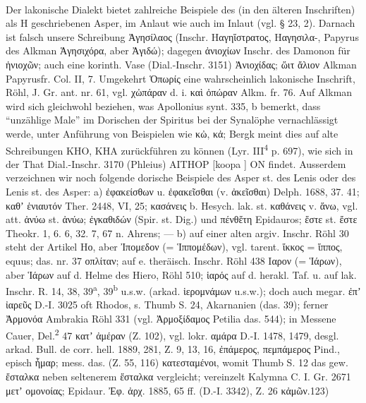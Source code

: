 \paragraph{} Der lakonische Dialekt bietet zahlreiche Beispiele des (in den
älteren Inschriften) als H geschriebenen Asper, im Anlaut wie auch im Inlaut
(vgl. § 23, 2). Darnach ist falsch unsere Schreibung Ἀγησίλαος (Inschr.
Ηαγηἵστρατος, Ηαγησιλα-, Papyrus des Alkman Ἁγησιχόρα, aber Ἀγιδώ); dagegen
ἀνιοχίων Inschr. des Damonon für ἡνιοχῶν; auch eine korinth. Vase (Dial.-Inschr.
3151) Ἀνιοχίδας; ὥιτ ἄλιον Alkman Papyrusfr. Col. II, 7. Umgekehrt Ὁπωρίς eine
wahrscheinlich lakonische Inschrift, Röhl, J. Gr. ant. nr. 61, vgl. χὠπάραν d.
i. καὶ ὀπώραν Alkm. fr. 76. Auf Alkman wird sich gleichwohl beziehen, was
Apollonius synt. 335, b bemerkt, dass “unzählige Male” im Dorischen der Spiritus
bei der Synalöphe vernachlässigt werde, unter Anführung von Beispielen wie κὠ,
κἀ; Bergk meint dies auf alte Schreibungen ΚΗΟ, ΚΗΑ zurückführen zu können (Lyr.
III\textsuperscript{4} p. 697), wie sich in der That Dial.-Inschr. 3170
(Phleius) ΑΙΤΗΟΡ [koopa ] ΟΝ findet. Ausserdem verzeichnen wir noch folgende
dorische Beispiele des Asper st. des Lenis oder des Lenis st. des Asper: a)
ἐφακείσθων u. ἐφακεῖσθαι (v. ἀκεῖσθαι) Delph. 1688, 37. 41; καθʼ ἑνιαυτόν Ther.
2448, VI, 25; κασάνεις b. Hesych. lak. st. καθάνεις v. ἅνω, vgl. att. ἁνύω st.
ἀνύω; ἐγκαθιδών (Spir. st. Dig.) und πένθἕτη Epidauros; ἕστε st. ἔστε Theokr. 1,
6. 6, 32. 7, 67 n. Ahrens; — b) auf einer alten argiv. Inschr. Röhl 30 steht der
Artikel Ηο, aber Ἰπομεδον (= Ἱππομέδων), vgl. tarent. ἴκκος = ἵππος, equus; das.
nr. 37 οπλίταν; auf e. theräisch. Inschr. Röhl 438 Ιαρον (= Ἱάρων), aber Ἱάρων
auf d. Helme des Hiero, Röhl 510; ἱαρός auf d. herakl. Taf. u. auf lak. Inschr.
R. 14, 38, 39\textsuperscript{a}, 39\textsuperscript{b} u.s.w. (arkad.
ἱερομνάμων u.s.w.); doch auch megar. ἐπʼ ἰαρεῦς D.-I. 3025 oft Rhodos, s.
Thumb S. 24, Akarnanien (das. 39); ferner Ἀρμονόα Ambrakia Röhl 331 (vgl.
Ἀρμοξίδαμος Petilia das. 544); in Messene Cauer, Del.\textsuperscript{2} 47 κατʼ
ἀμέραν (Z. 102), vgl. lokr. αμάρα D.-I. 1478, 1479, desgl. arkad. Bull. de corr.
hell. 1889, 281, Z. 9, 13, 16, ἐπάμερος, πεμπάμερος Pind., episch ἦμαρ; mess.
das. (Z. 55, 116) κατεσταμένοι, womit Thumb S. 12 das gew. ἔσταλκα neben
seltenerem ἕσταλκα vergleicht; vereinzelt Kalymna C. I. Gr. 2671 μετʼ ομονοίας;
Epidaur. Ἐφ. ἀρχ. 1885, 65 ff. (D.-I. 3342), Z. 26 κἀμῶν.123) 

